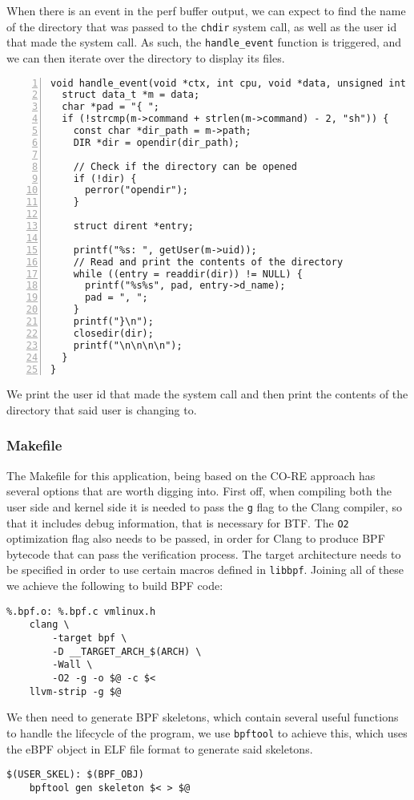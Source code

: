 When there is an event in the perf buffer output, we can expect to find the name of the directory that was passed to the \texttt{chdir} system call, as well as the user id that made the system call. As such, the \texttt{handle\_event} function is triggered, and we can then iterate over the directory to display its files. 
\begin{lstlisting}[numbers=left]
void handle_event(void *ctx, int cpu, void *data, unsigned int data_sz) {
  struct data_t *m = data;
  char *pad = "{ ";
  if (!strcmp(m->command + strlen(m->command) - 2, "sh")) {
    const char *dir_path = m->path;
    DIR *dir = opendir(dir_path);

    // Check if the directory can be opened
    if (!dir) {
      perror("opendir");
    }

    struct dirent *entry;

    printf("%s: ", getUser(m->uid));
    // Read and print the contents of the directory
    while ((entry = readdir(dir)) != NULL) {
      printf("%s%s", pad, entry->d_name);
      pad = ", ";
    }
    printf("}\n");
    closedir(dir);
    printf("\n\n\n\n");
  }
}
\end{lstlisting}
We print the user id that made the system call and then print the contents of the directory that said user is changing to.


\subsubsection{Makefile}
The Makefile for this application, being based on the CO-RE approach has several options that are worth digging into. 
First off, when compiling both the user side and kernel side it is needed to pass the \texttt{\-g} flag to the Clang compiler, so that it includes debug information, that is necessary for BTF. The \texttt{\-O2} optimization flag also needs to be passed, in order for Clang to produce BPF bytecode that can pass the verification process. The target architecture needs to be specified in order to use certain macros defined in \texttt{libbpf}. Joining all of these we achieve the following to build BPF code:
\begin{lstlisting}
%.bpf.o: %.bpf.c vmlinux.h
	clang \
	    -target bpf \
        -D __TARGET_ARCH_$(ARCH) \
	    -Wall \
	    -O2 -g -o $@ -c $<
	llvm-strip -g $@
\end{lstlisting}

We then need to generate BPF skeletons, which contain several useful functions to handle the lifecycle of the program, we use \texttt{bpftool} to achieve this, which uses the eBPF object in ELF file format to generate said skeletons. 
\begin{lstlisting}
$(USER_SKEL): $(BPF_OBJ)
	bpftool gen skeleton $< > $@
\end{lstlisting}

